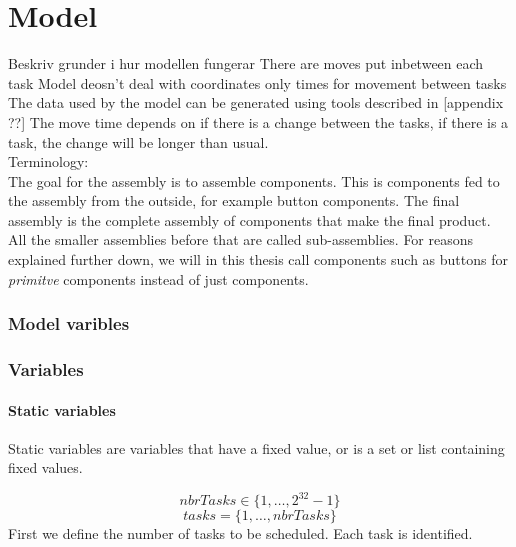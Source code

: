  \chapter{Model}
 
 Beskriv grunder i hur modellen fungerar
 There are moves put inbetween each task
 Model deosn't deal with coordinates only times for movement between tasks
 The data used by the model can be generated using tools described in [appendix ??]
 The move time depends on if there is a change between the tasks, if there is a task, the change will be longer than usual.
 \\Terminology:\\
 The goal for the assembly is to assemble components. This is components fed to the assembly from the outside, for example button components. The final assembly is the complete assembly of components that make the final product. All the smaller assemblies before that are called sub-assemblies. For reasons explained further down, we will in this thesis call components such as buttons for \emph{primitve} components instead of just components.
 \subsection{Model varibles}
 \subsection{Variables}
 \subsubsection{Static variables}
 Static variables are variables that have a fixed value, or is a set or list containing fixed values.
 
 \begin{equation}\label{eq:1}
 nbrTasks \in \{1 , \ldots , 2^{32}-1\}
 \end{equation}
 \begin{equation}\label{eq:10}
 tasks = \{1 , \ldots , nbrTasks\}
 \end{equation}
 First we define the number of tasks to be scheduled. Each task is identified.

